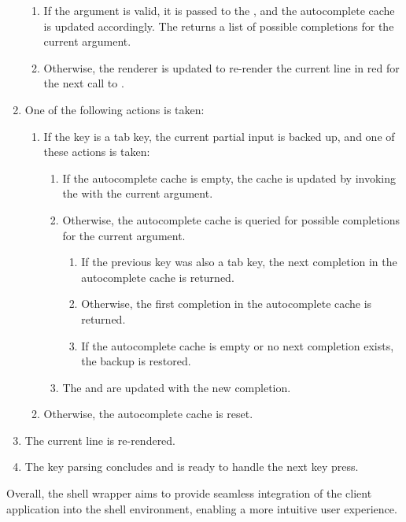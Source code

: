 \begin{enumerate}
    \begin{enumerate}
        \item If the argument is valid, it is passed to the , and the autocomplete cache is updated accordingly. The  returns a list of possible completions for the current argument.
        \item Otherwise, the renderer is updated to re-render the current line in red for the next call to .
    \end{enumerate}
    \item One of the following actions is taken:
    \begin{enumerate}
        \item If the key is a tab key, the current partial input is backed up, and one of these actions is taken:
        \begin{enumerate}
            \item If the autocomplete cache is empty, the cache is updated by invoking the  with the current argument.
            \item Otherwise, the autocomplete cache is queried for possible completions for the current argument.
            \begin{enumerate}
                \item If the previous key was also a tab key, the next completion in the autocomplete cache is returned.
                \item Otherwise, the first completion in the autocomplete cache is returned.
                \item If the autocomplete cache is empty or no next completion exists, the backup is restored.
            \end{enumerate}
            \item The  and  are updated with the new completion.
        \end{enumerate}
        \item Otherwise, the autocomplete cache is reset.
    \end{enumerate}
    \item The current line is re-rendered.
    \item The key parsing concludes and is ready to handle the next key press.
\end{enumerate}

Overall, the shell wrapper aims to provide seamless integration of the client application into the shell environment, enabling a more intuitive user experience.

